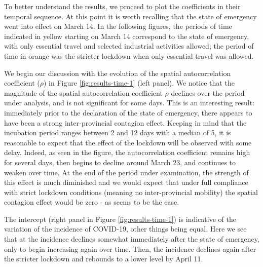 \documentclass[]{elsarticle} %
\begin{document}
To better understand the results, we proceed to plot the coefficients in
their temporal sequence. At this point it is worth recalling that the
state of emergency went into effect on March 14. In the following
figures, the periods of time indicated in yellow starting on March 14
correspond to the state of emergency, with only essential travel and
selected industrial activities allowed; the period of time in orange was
the stricter lockdown when only essential travel was allowed.

We begin our discussion with the evolution of the spatial
autocorrelation coefficient (\(\rho\)) in Figure
\ref{fig:results-time-1} (left panel). We notice that the magnitude of
the spatial autocorrelation coefficient \(\rho\) declines over the
period under analysis, and is not significant for some days. This is an
interesting result: immediately prior to the declaration of the state of
emergency, there appears to have been a strong inter-provincial
contagion effect. Keeping in mind that the incubation period ranges
between 2 and 12 days with a median of 5, it is reasonable to expect
that the effect of the lockdown will be observed with some delay.
Indeed, as seen in the figure, the autocorrelation coefficient remains
high for several days, then begins to decline around March 23, and
continues to weaken over time. At the end of the period under
examination, the strength of this effect is much diminished and we would
expect that under full compliance with strict lockdown conditions
(meaning no inter-provincial mobility) the spatial contagion effect
would be zero - as seems to be the case.

The intercept (right panel in Figure \ref{fig:results-time-1}) is
indicative of the variation of the incidence of COVID-19, other things
being equal. Here we see that at the incidence declines somewhat
immediately after the state of emergency, only to begin increasing again
over time. Then, the incidence declines again after the stricter
lockdown and rebounds to a lower level by April 11.
\end{document}
